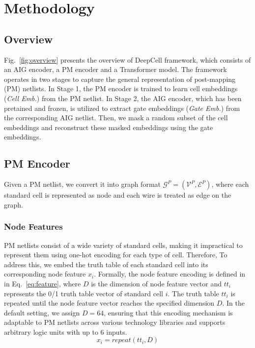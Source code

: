 \section{Methodology} \label{Sec:Method}
\subsection{Overview}
Fig.~\ref{fig:overview} presents the overview of DeepCell framework, which consists of an AIG encoder, a PM encoder and a Transformer model. The framework operates in two stages to capture the general representation of post-mapping (PM) netlists. In Stage 1, the PM encoder is trained to learn cell embeddings (\textit{Cell Emb.}) from the PM netlist. In Stage 2, the AIG encoder, which has been pretained and frozen, is utilized to extract gate embeddings (\textit{Gate Emb.}) from the corresponding AIG netlist. Then, we mask a random subset of the cell embeddings and reconstruct these masked embeddings using the gate embeddings. 

\subsection{PM Encoder}
Given a PM netlist, we convert it into graph format $\mathcal{G}^P=(\mathcal{V}^P, \mathcal{E}^P)$, where each standard cell is represented as node and each wire is treated as edge on the graph. 

\subsubsection{Node Features}
PM netlists consist of a wide variety of standard cells, making it impractical to represent them using one-hot encoding for each type of cell. Therefore, To address this, we embed the truth table of each standard cell into its corresponding node feature $x_{i}$. Formally, the node feature encoding is defined in in Eq.~\eqref{eq:feature}, where $D$ is the dimension of node feature vector and $tt_{i}$ represents the 0/1 truth table vector of standard cell $i$. The truth table $tt_i$ is repeated until the node feature vector reaches the specified dimension $D$. In the default setting, we assign $D=64$, ensuring that this encoding mechanism is adaptable to PM netlists across various technology libraries and supports arbitrary logic units with up to 6 inputs. 
\begin{equation} \label{eq:feature}
    x_i = repeat(tt_i, D)
\end{equation}

